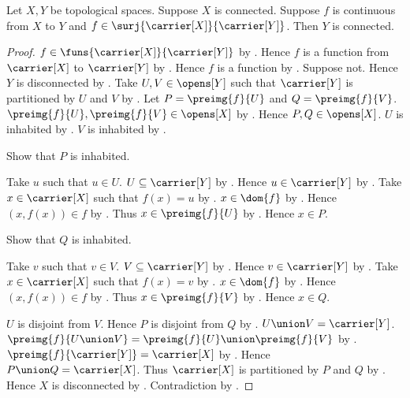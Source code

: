 \begin{theorem}\label{continuous_surjective_image_is_connected}
    Let $X,Y$ be topological spaces.
    Suppose $X$ is connected.
    Suppose $f$ is continuous from $X$ to $Y$ and
        $f\in\surj{\carrier[X]}{\carrier[Y]}$.
    Then $Y$ is connected.
\end{theorem}
\begin{proof}
    $f\in\funs{\carrier[X]}{\carrier[Y]}$ by
        .
    Hence $f$ is a function from $\carrier[X]$ to $\carrier[Y]$
        by .
    Hence $f$ is a function by .
    Suppose not.
    Hence $Y$ is disconnected by .
    Take $U,V\in\opens[Y]$ such that
        $\carrier[Y]$ is partitioned by $U$ and $V$ by
        .
    Let $P=\preimg{f}{U}$ and $Q=\preimg{f}{V}$.
    $\preimg{f}{U},\preimg{f}{V}\in\opens[X]$ by
        .
    Hence $P,Q\in\opens[X]$.
    $U$ is inhabited by .
    $V$ is inhabited by .

    Show that $P$ is inhabited.
    \begin{subproof}
        Take $u$ such that $u\in U$.
        $U\subseteq\carrier[Y]$ by .
        Hence $u\in\carrier[Y]$ by .
        Take $x\in\carrier[X]$ such that $f(x)=u$ by
            .
        $x\in\dom{f}$ by .
        Hence $(x,f(x))\in f$ by .
        Thus $x\in\preimg{f}{U}$ by .
        Hence $x\in P$.
    \end{subproof}
    Show that $Q$ is inhabited.
    \begin{subproof}
        Take $v$ such that $v\in V$.
        $V\subseteq\carrier[Y]$ by .
        Hence $v\in\carrier[Y]$ by .
        Take $x\in\carrier[X]$ such that $f(x)=v$ by
            .
        $x\in\dom{f}$ by .
        Hence $(x,f(x))\in f$ by .
        Thus $x\in\preimg{f}{V}$ by .
        Hence $x\in Q$.
    \end{subproof}

    $U$ is disjoint from $V$.
    Hence $P$ is disjoint from $Q$ by
        .
    $U\union V=\carrier[Y]$.
    $\preimg{f}{U\union V}
        =\preimg{f}{U}\union\preimg{f}{V}$ by
        .
    $\preimg{f}{\carrier[Y]}=\carrier[X]$ by
        .
    Hence $P\union Q=\carrier[X]$.
    Thus $\carrier[X]$ is partitioned by $P$ and $Q$ by
        \auto.
    Hence $X$ is disconnected by .
    Contradiction by .
\end{proof}

